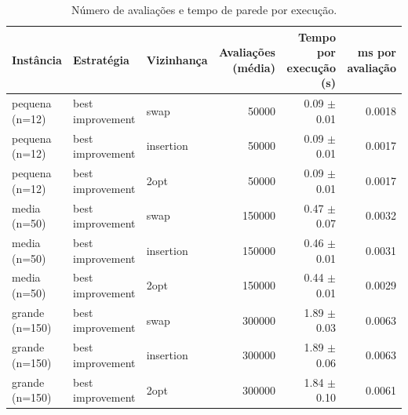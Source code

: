 \begin{table}[ht]
\centering
\small
\caption{Número de avaliações e tempo de parede por execução.}
\label{tab:tempo_avaliacoes}
\begin{tabular}{lllrrr}
\hline
Instância & Estratégia & Vizinhança & Avaliações (média) & Tempo por execução (s) & ms por avaliação \\
\hline
pequena (n=12) & best improvement & swap & 50000 & 0.09 $\pm$ 0.01 & 0.0018 \\
pequena (n=12) & best improvement & insertion & 50000 & 0.09 $\pm$ 0.01 & 0.0017 \\
pequena (n=12) & best improvement & 2opt & 50000 & 0.09 $\pm$ 0.01 & 0.0017 \\
\hline
media (n=50) & best improvement & swap & 150000 & 0.47 $\pm$ 0.07 & 0.0032 \\
media (n=50) & best improvement & insertion & 150000 & 0.46 $\pm$ 0.01 & 0.0031 \\
media (n=50) & best improvement & 2opt & 150000 & 0.44 $\pm$ 0.01 & 0.0029 \\
\hline
grande (n=150) & best improvement & swap & 300000 & 1.89 $\pm$ 0.03 & 0.0063 \\
grande (n=150) & best improvement & insertion & 300000 & 1.89 $\pm$ 0.06 & 0.0063 \\
grande (n=150) & best improvement & 2opt & 300000 & 1.84 $\pm$ 0.10 & 0.0061 \\
\hline
\end{tabular}
\end{table}
